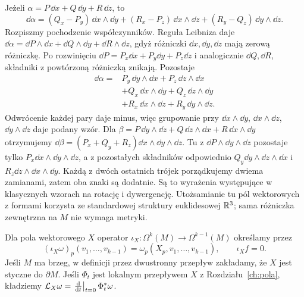 \begin{przyklad}[Rachunek na $\R^3$]
\label{prz:formy-rachunek-r3}
Jeżeli $\alpha=P\,\dd x+Q\,\dd y+R\,\dd z$, to
\[
 \dd\alpha=(Q_x-P_y)\,\dd x\wedge\dd y
 +(R_x-P_z)\,\dd x\wedge\dd z
 +(R_y-Q_z)\,\dd y\wedge\dd z.
\]
Rozpiszmy pochodzenie współczynników. Reguła Leibniza daje
$\dd\alpha=\dd P\wedge\dd x+\dd Q\wedge\dd y+\dd R\wedge\dd z$,
gdyż różniczki $\dd x,\dd y,\dd z$ mają zerową różniczkę.
Po rozwinięciu $\dd P=P_x\dd x+P_y\dd y+P_z\dd z$
i analogicznie $\dd Q,\dd R$, składniki z powtórzoną
różniczką znikają. Pozostaje
\[
 \begin{aligned}
 \dd\alpha={}&P_y\,\dd y\wedge\dd x+P_z\,\dd z\wedge\dd x\\
 &+Q_x\,\dd x\wedge\dd y+Q_z\,\dd z\wedge\dd y\\
 &+R_x\,\dd x\wedge\dd z+R_y\,\dd y\wedge\dd z.
 \end{aligned}
\]
Odwrócenie każdej pary daje minus, więc grupowanie
przy $\dd x\wedge\dd y$, $\dd x\wedge\dd z$,
$\dd y\wedge\dd z$ daje podany wzór.
Dla $\beta=P\,\dd y\wedge\dd z
+Q\,\dd z\wedge\dd x+R\,\dd x\wedge\dd y$
otrzymujemy $\dd\beta=(P_x+Q_y+R_z)
\dd x\wedge\dd y\wedge\dd z$.
Tu z $\dd P\wedge\dd y\wedge\dd z$ pozostaje tylko
$P_x\dd x\wedge\dd y\wedge\dd z$, a z pozostałych
składników odpowiednio $Q_y\dd y\wedge\dd z\wedge\dd x$
i $R_z\dd z\wedge\dd x\wedge\dd y$.
Każdą z dwóch ostatnich trójek porządkujemy dwiema zamianami,
zatem oba znaki są dodatnie.
Są to wyrażenia występujące w klasycznych wzorach na rotację
i dywergencję. Utożsamianie tu pól wektorowych z formami
korzysta ze standardowej struktury euklidesowej $\R^3$;
sama różniczka zewnętrzna na $M$ nie wymaga metryki.
\end{przyklad}

\begin{definicja}
\label{def:formy-kontrakcja-lie}
Dla pola wektorowego $X$ operator
$\iota_X:\Omega^k(M)\to\Omega^{k-1}(M)$ określamy przez
\[
 (\iota_X\omega)_p(v_1,\ldots,v_{k-1})
 =\omega_p(X_p,v_1,\ldots,v_{k-1}),
 \qquad \iota_Xf=0.
\]
Jeśli $M$ ma brzeg, w definicji przez dwustronny przepływ
zakładamy, że $X$ jest styczne do $\partial M$.
Jeśli $\Phi_t$ jest lokalnym przepływem $X$ z
Rozdziału~\ref{ch:pola}, kładziemy
$\mathcal L_X\omega=\left.\frac{\mathrm d}{\mathrm d t}\right|_{t=0}\Phi_t^*\omega$.
\end{definicja}

